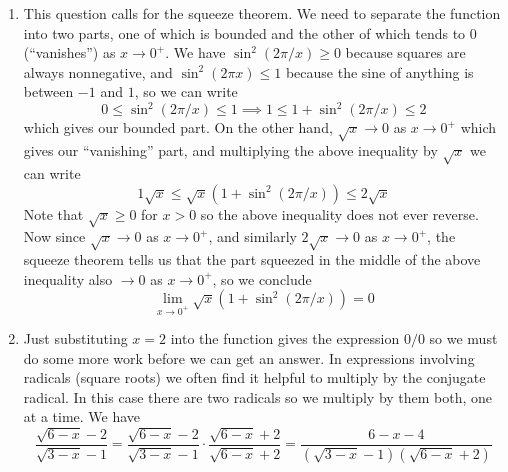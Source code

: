 \documentclass{article}
\begin{document}
\begin{enumerate}
\item %
  This question calls for the squeeze theorem.  We need to separate the 
  function into two parts, one of which is bounded and the other of which
  tends to $0$ (``vanishes'')
  as $x\to 0^+$.  We have $\sin^2(2\pi/x)\ge 0$ because squares
  are always nonnegative, and $\sin^2(2\pi x)\le 1$ because the sine of 
  anything is between $-1$ and $1$, so we can write
  \begin{equation*}
    0\le \sin^2(2\pi/x) \le 1 \implies 1 \le 1+\sin^2(2\pi/x) \le 2
  \end{equation*}
  which gives our bounded part.  On the other hand, $\sqrt{x}\to 0$ as
  $x\to 0^+$ which gives our ``vanishing'' part, and multiplying the 
  above inequality by $\sqrt{x}$ we can write
  \begin{equation*}
    1\sqrt{x} \le \sqrt{x}(1+\sin^2(2\pi/x)) \le 2\sqrt{x}
  \end{equation*}
  Note that $\sqrt{x}\ge 0$ for $x>0$ so the above inequality does not 
  ever reverse.  Now since $\sqrt{x}\to 0$ as $x\to 0^+$, and similarly
  $2\sqrt{x}\to 0$ as $x\to 0^+$, the squeeze theorem tells us that the
  part squeezed in the middle of the above inequality 
  also $\to 0$ as $x\to 0^+$, so we conclude
  \begin{equation*}
    \lim_{x\to 0^+} \sqrt{x}(1+\sin^2(2\pi/x)) = 0
  \end{equation*}
\item %
  Just substituting $x=2$ into the function gives the expression $0/0$ so
  we must do some more work before we can get an answer.  In expressions
  involving radicals (square roots) we often find it helpful to multiply
  by the conjugate radical.  In this case there are two radicals so we 
  multiply by them both, one at a time.  We have
  \begin{equation*}
    \frac{\sqrt{6-x}-2}{\sqrt{3-x}-1}
    = \frac{\sqrt{6-x}-2}{\sqrt{3-x}-1} \cdot \frac{\sqrt{6-x}+2}{\sqrt{6-x}+2}
    = \frac{6-x-4}{(\sqrt{3-x}-1)(\sqrt{6-x}+2)}

\end{equation*}
\end{enumerate}
\end{document}
